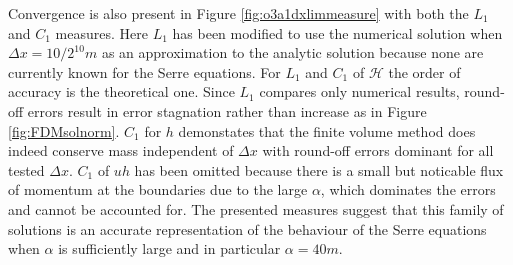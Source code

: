 \documentclass[SingleSpace,12pt,Proceedings]{Serre_ASCE}
\begin{document}
Convergence is also present in Figure \ref{fig:o3a1dxlimmeasure} with both the $L_1$ and $C_1$ measures. Here $L_1$ has been modified to use the numerical solution when $\Delta x = 10 / 2^{10}m$ as an approximation to the analytic solution because none are currently known for the Serre equations. For $L_1$ and $C_1$ of $\mathcal{H}$ the order of accuracy is the theoretical one. Since $L_1$ compares only numerical results, round-off errors result in error stagnation rather than increase as in Figure \ref{fig:FDMsolnorm}. $C_1$ for $h$ demonstates that the finite volume method does indeed conserve mass independent of $\Delta x$ with round-off errors dominant for all tested $\Delta x$. $C_1$ of $uh$ has been omitted because there is a small but noticable flux of momentum at the boundaries due to the large $\alpha$, which dominates the errors and cannot be accounted for. The presented measures suggest that this family of solutions is an accurate representation of the behaviour of the Serre equations when $\alpha$ is sufficiently large and in particular $\alpha = 40m$. 
\end{document}
